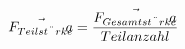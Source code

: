 \documentclass[preview]{standalone}
\begin{document}
\begin{align*}
\special{dvisvgm:raw <g id='unique000'>}\vec{F_{Teilst \ddot{a} rke}} = \frac{\vec{F_{Gesamtst \ddot{a} rke}}} {Teilanzahl}\special{dvisvgm:raw </g>}
\end{align*}
\end{document}
